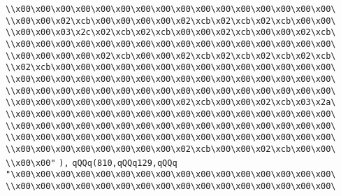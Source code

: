 \verb|\\x00\x00\x00\x00\x00\x00\x00\x00\x00\x00\x00\x00\x00\x00\x00\x00\|\newline
\verb|\\x00\x00\x02\xcb\x00\x00\x00\x00\x02\xcb\x02\xcb\x02\xcb\x00\x00\|\newline
\verb|\\x00\x00\x03\x2c\x02\xcb\x02\xcb\x00\x00\x02\xcb\x00\x00\x02\xcb\|\newline
\verb|\\x00\x00\x00\x00\x00\x00\x00\x00\x00\x00\x00\x00\x00\x00\x00\x00\|\newline
\verb|\\x00\x00\x00\x00\x02\xcb\x00\x00\x02\xcb\x02\xcb\x02\xcb\x02\xcb\|\newline
\verb|\\x02\xcb\x00\x00\x00\x00\x00\x00\x00\x00\x00\x00\x00\x00\x00\x00\|\newline
\verb|\\x00\x00\x00\x00\x00\x00\x00\x00\x00\x00\x00\x00\x00\x00\x00\x00\|\newline
\verb|\\x00\x00\x00\x00\x00\x00\x00\x00\x00\x00\x00\x00\x00\x00\x00\x00\|\newline
\verb|\\x00\x00\x00\x00\x00\x00\x00\x00\x02\xcb\x00\x00\x02\xcb\x03\x2a\|\newline
\verb|\\x00\x00\x00\x00\x00\x00\x00\x00\x00\x00\x00\x00\x00\x00\x00\x00\|\newline
\verb|\\x00\x00\x00\x00\x00\x00\x00\x00\x00\x00\x00\x00\x00\x00\x00\x00\|\newline
\verb|\\x00\x00\x00\x00\x00\x00\x00\x00\x00\x00\x00\x00\x00\x00\x00\x00\|\newline
\verb|\\x00\x00\x00\x00\x00\x00\x00\x00\x02\xcb\x00\x00\x02\xcb\x00\x00\|\newline
\verb|\\x00\x00"|\newline
\verb|),|\newline
\verb|qQQq(810,qQQq129,qQQq|\newline
\verb|"\x00\x00\x00\x00\x00\x00\x00\x00\x00\x00\x00\x00\x00\x00\x00\x00\|\newline
\verb|\\x00\x00\x00\x00\x00\x00\x00\x00\x00\x00\x00\x00\x00\x00\x00\x00\|\newline
